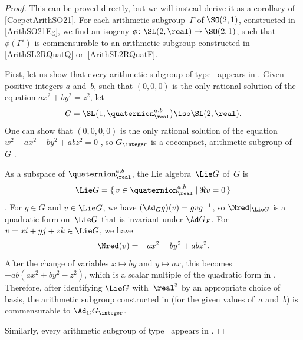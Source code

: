\begin{proof}
 This can be proved directly, but we will instead derive it as a
corollary of \cref{CocpctArithSO21}. For each
arithmetic subgroup~$\Gamma$ of $\SO(2,1)$, constructed in
\cref{ArithSO21Eg}, we find an isogeny $\phi \colon \SL(2,\real) \to
\SO(2,1)$, such that $\phi(\Gamma')$ is commensurable
to an arithmetic
subgroup constructed in
\cref{ArithSL2RQuatQ} or~\ref{ArithSL2RQuatF}.

 First, let us show that every arithmetic subgroup
of type~ appears in
. Given positive integers $a$ and~$b$,
such that $(0,0,0)$ is the only rational solution of the
equation $a x^2 + b y^2 = z^2$, let
 $$G 
 = \SL \bigl( 1,\quaternion^{a,b}_\real \bigr) \iso \SL(2,\real) .$$
 One can show that $(0,0,0,0)$ is the only rational
solution of the equation $w^2 - a x^2 - b y^2 + a b z^2 = 0$
, so $G_{\integer}$ is a cocompact,
arithmetic subgroup of~$G$ .

As a subspace of $\quaternion^{a,b}_\real$, the Lie algebra~$\Lie G$
of~$G$ is
 $$ \Lie G = \{\, v \in \quaternion^{a,b}_\real \mid \Re v = 0 \,\}
$$
 . For $g \in G$ and $v \in \Lie G$, we
have $(\Ad_G g)(v) = g v g^{-1}$, so $\Nred|_{\Lie G}$ is a
quadratic form on~$\Lie G$ that is invariant under $\Ad
G_F$. For $v = x i + y j + z k \in \Lie G$, we have
 $$ \Nred(v) = -a x^2 - b y^2 + ab z^2 .$$
 After the change of variables $x \mapsto b y$ and $y
\mapsto a x$, this becomes $-ab(a x^2 + b y^2 - z^2)$,
which is a scalar multiple of the quadratic form in
. Therefore, after identifying $\Lie G$
with~$\real^3$ by an appropriate choice of basis, the
arithmetic subgroup constructed in  (for the
given values of~$a$ and~$b$) is commensurable to $\Ad_G
G_{\integer}$.

 Similarly, every arithmetic subgroup of
type~ appears in
 .
 \end{proof}


